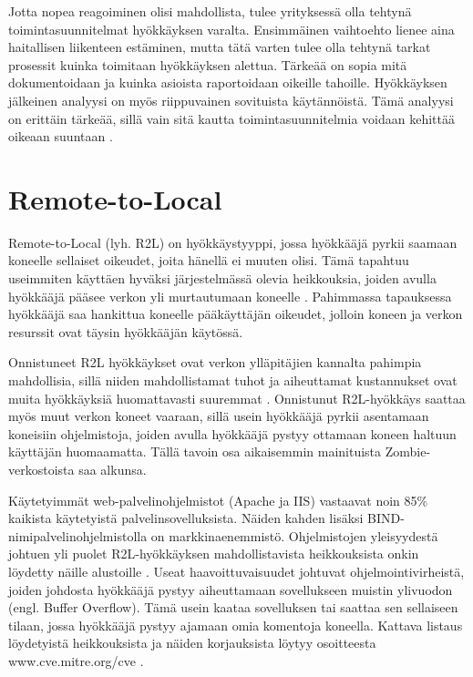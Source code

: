 Jotta nopea reagoiminen olisi mahdollista, tulee yrityksessä olla tehtynä
toimintasuunnitelmat hyökkäyksen varalta. Ensimmäinen vaihtoehto lienee aina
haitallisen liikenteen estäminen, mutta tätä varten tulee olla tehtynä tarkat
prosessit kuinka toimitaan hyökkäyksen alettua. Tärkeää on sopia mitä
dokumentoidaan ja kuinka asioista raportoidaan oikeille tahoille. Hyökkäyksen
jälkeinen analyysi on myös riippuvainen sovituista käytännöistä. Tämä analyysi
on erittäin tärkeää, sillä vain sitä kautta toimintasuunnitelmia voidaan
kehittää oikeaan suuntaan \cite{DDOS}.


\section{Remote-to-Local}

Remote-to-Local (lyh. R2L) on hyökkäystyyppi, jossa hyökkääjä pyrkii
saamaan koneelle sellaiset oikeudet, joita hänellä ei muuten
olisi. Tämä tapahtuu useimmiten käyttäen hyväksi järjestelmässä olevia
heikkouksia, joiden avulla hyökkääjä pääsee verkon yli murtautumaan
koneelle \cite{IDS}. Pahimmassa tapauksessa hyökkääjä saa hankittua koneelle
pääkäyttäjän oikeudet, jolloin koneen ja verkon resurssit ovat täysin
hyökkääjän käytössä.

Onnistuneet R2L hyökkäykset ovat verkon ylläpitäjien kannalta pahimpia
mahdollisia, sillä niiden mahdollistamat tuhot ja aiheuttamat kustannukset ovat
muita hyökkäyksiä huomattavasti suuremmat \cite{IDSb}. Onnistunut R2L-hyökkäys saattaa
myös muut verkon koneet vaaraan, sillä usein hyökkääjä pyrkii asentamaan
koneisiin ohjelmistoja, joiden avulla hyökkääjä pystyy ottamaan koneen haltuun
käyttäjän huomaamatta. Tällä tavoin osa aikaisemmin mainituista Zombie-
verkostoista saa alkunsa.

Käytetyimmät web-palvelinohjelmistot (Apache ja IIS) vastaavat noin 85\%
kaikista käytetyistä palvelinsovelluksista. Näiden kahden lisäksi BIND-
nimipalvelinohjelmistolla on markkinaenemmistö. Ohjelmistojen yleisyydestä
johtuen yli puolet R2L-hyökkäyksen mahdollistavista heikkouksista onkin
löydetty näille alustoille \cite{IDS}. Useat haavoittuvaisuudet johtuvat
ohjelmointivirheistä, joiden johdosta hyökkääjä pystyy aiheuttamaan
sovellukseen muistin ylivuodon (engl. Buffer Overflow). Tämä usein kaataa
sovelluksen tai saattaa sen sellaiseen tilaan, jossa hyökkääjä pystyy ajamaan
omia komentoja koneella. Kattava listaus löydetyistä heikkouksista ja näiden
korjauksista löytyy osoitteesta www.cve.mitre.org/cve \cite{CVE}.

